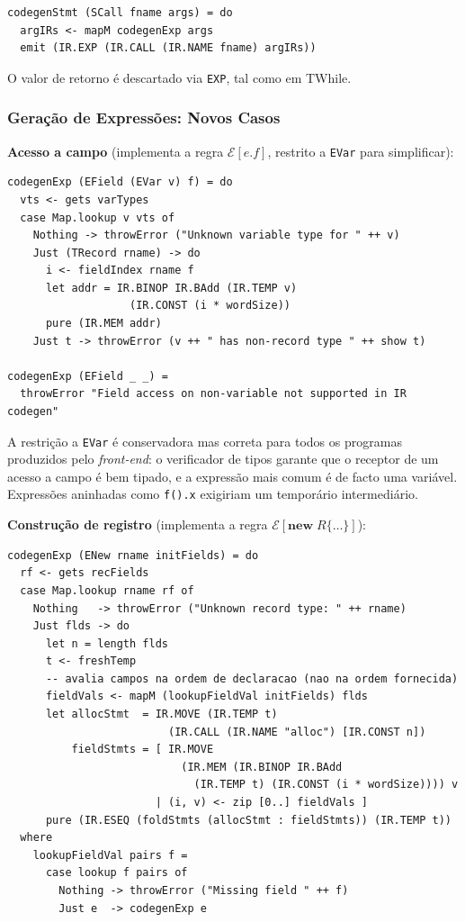 \begin{verbatim}
codegenStmt (SCall fname args) = do
  argIRs <- mapM codegenExp args
  emit (IR.EXP (IR.CALL (IR.NAME fname) argIRs))
\end{verbatim}

O valor de retorno é descartado via \texttt{EXP}, tal como em TWhile.

\subsubsection*{Geração de Expressões: Novos Casos}

\textbf{Acesso a campo} (implementa a regra $\mathcal{E}[e.f]$, restrito
a \texttt{EVar} para simplificar):

\begin{verbatim}
codegenExp (EField (EVar v) f) = do
  vts <- gets varTypes
  case Map.lookup v vts of
    Nothing -> throwError ("Unknown variable type for " ++ v)
    Just (TRecord rname) -> do
      i <- fieldIndex rname f
      let addr = IR.BINOP IR.BAdd (IR.TEMP v)
                   (IR.CONST (i * wordSize))
      pure (IR.MEM addr)
    Just t -> throwError (v ++ " has non-record type " ++ show t)

codegenExp (EField _ _) =
  throwError "Field access on non-variable not supported in IR codegen"
\end{verbatim}

A restrição a \texttt{EVar} é conservadora mas correta para todos os
programas produzidos pelo \emph{front-end}: o verificador de tipos garante
que o receptor de um acesso a campo é bem tipado, e a expressão mais
comum é de facto uma variável. Expressões aninhadas como
\texttt{f().x} exigiriam um temporário intermediário.

\textbf{Construção de registro} (implementa a regra
$\mathcal{E}[\mathbf{new}\;R\{\ldots\}]$):

\begin{verbatim}
codegenExp (ENew rname initFields) = do
  rf <- gets recFields
  case Map.lookup rname rf of
    Nothing   -> throwError ("Unknown record type: " ++ rname)
    Just flds -> do
      let n = length flds
      t <- freshTemp
      -- avalia campos na ordem de declaracao (nao na ordem fornecida)
      fieldVals <- mapM (lookupFieldVal initFields) flds
      let allocStmt  = IR.MOVE (IR.TEMP t)
                         (IR.CALL (IR.NAME "alloc") [IR.CONST n])
          fieldStmts = [ IR.MOVE
                           (IR.MEM (IR.BINOP IR.BAdd
                             (IR.TEMP t) (IR.CONST (i * wordSize)))) v
                       | (i, v) <- zip [0..] fieldVals ]
      pure (IR.ESEQ (foldStmts (allocStmt : fieldStmts)) (IR.TEMP t))
  where
    lookupFieldVal pairs f =
      case lookup f pairs of
        Nothing -> throwError ("Missing field " ++ f)
        Just e  -> codegenExp e
\end{verbatim}

